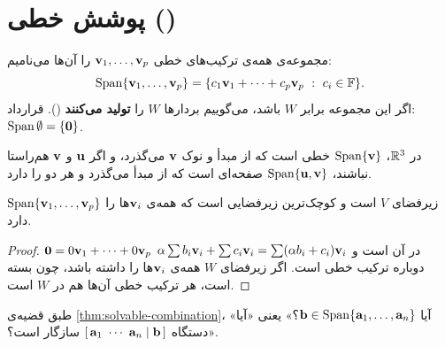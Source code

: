 \begin{center}
\\[1mm]{\small {}}
\end{center}

\section{پوشش خطی ()}

\begin{definition}
مجموعه‌ی همه‌ی ترکیب‌های خطی $\mathbf{v}_1,\dots,\mathbf{v}_p$ را  آن‌ها می‌نامیم:
\[
\Span\{\vv_1,\dots,\vv_p\}=\{c_1\vv_1+\dots+c_p\vv_p\ :\ c_i\in\F\}.
\]
اگر این مجموعه برابر $W$ باشد، می‌گوییم بردارها $W$ را \textbf{تولید می‌کنند} (). قرارداد: $\operatorname{Span}\emptyset=\{\mathbf{0}\}$.
\end{definition}

\begin{intuition}
در $\mathbb{R}^3$، $\operatorname{Span}\{\mathbf{v}\}$ خطی است که از مبدأ و نوک $\mathbf{v}$ می‌گذرد، و اگر $\mathbf{u}$ و $\mathbf{v}$ هم‌راستا نباشند، $\operatorname{Span}\{\mathbf{u},\mathbf{v}\}$ صفحه‌ای است که از مبدأ می‌گذرد و هر دو را دارد.
\end{intuition}

\begin{theorem}\label{thm:span-subspace}
$\operatorname{Span}\{\mathbf{v}_1,\dots,\mathbf{v}_p\}$ زیرفضای $V$ است و کوچک‌ترین زیرفضایی است که همه‌ی $\mathbf{v}_i$ها را دارد.
\end{theorem}
\begin{proof}
$\mathbf{0}=0\mathbf{v}_1+\dots+0\mathbf{v}_p$ در آن است و
$\alpha\sum b_i\mathbf{v}_i+\sum c_i\mathbf{v}_i=\sum(\alpha b_i+c_i)\mathbf{v}_i$
دوباره ترکیب خطی  است. اگر زیرفضای $W$ همه‌ی $\mathbf{v}_i$ها را داشته باشد، چون بسته است، هر ترکیب خطی آن‌ها هم در $W$ است.
\end{proof}

\begin{note}
طبق قضیه‌ی \ref{thm:solvable-combination}، «آیا $\mathbf{b}\in\operatorname{Span}\{\mathbf{a}_1,\dots,\mathbf{a}_n\}$؟» یعنی «آیا دستگاه $\aug{\va_1\ \cdots\ \va_n}{\vb}$ سازگار  است؟».
\end{note}

